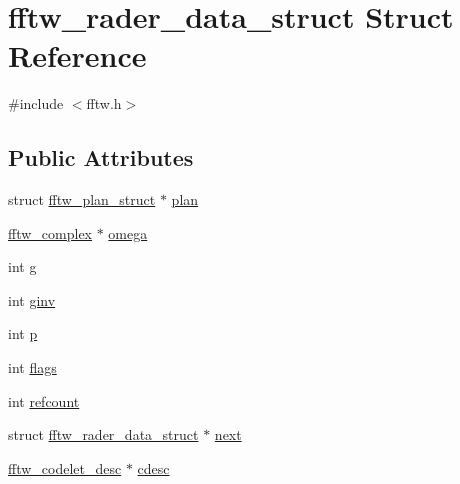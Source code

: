 \hypertarget{structfftw__rader__data__struct}{\section{fftw\-\_\-rader\-\_\-data\-\_\-struct Struct Reference}
\label{structfftw__rader__data__struct}
}


{\ttfamily \#include $<$fftw.\-h$>$}

\subsection*{Public Attributes}
\begin{DoxyCompactItemize}
\item 
struct \hyperlink{structfftw__plan__struct}{fftw\-\_\-plan\-\_\-struct} $\ast$ \hyperlink{structfftw__rader__data__struct_aa0fdaee84fabe8a6ecb74ea4a05ab122}{plan}
\item 
\hyperlink{structfftw__complex}{fftw\-\_\-complex} $\ast$ \hyperlink{structfftw__rader__data__struct_ad1d3d661e6e97fae6126859ca63a48ea}{omega}
\item 
int \hyperlink{structfftw__rader__data__struct_ac68beea87d3834df881cd1280844c137}{g}
\item 
int \hyperlink{structfftw__rader__data__struct_a257e9bf9422665e3f326e6785d7e9842}{ginv}
\item 
int \hyperlink{structfftw__rader__data__struct_a7c62f135742d0c0a3303950f78421815}{p}
\item 
int \hyperlink{structfftw__rader__data__struct_a38ce2e82dafdd0d54eeeff4739a8f533}{flags}
\item 
int \hyperlink{structfftw__rader__data__struct_ae8416156b430120934321df66227c97f}{refcount}
\item 
struct \hyperlink{structfftw__rader__data__struct}{fftw\-\_\-rader\-\_\-data\-\_\-struct} $\ast$ \hyperlink{structfftw__rader__data__struct_add6c58655fd3f3a60398822f85d7d5b3}{next}
\item 
\hyperlink{structfftw__codelet__desc}{fftw\-\_\-codelet\-\_\-desc} $\ast$ \hyperlink{structfftw__rader__data__struct_a0dbac3bc83b52b0bd26b716a030d0ee8}{cdesc}
\end{DoxyCompactItemize}


